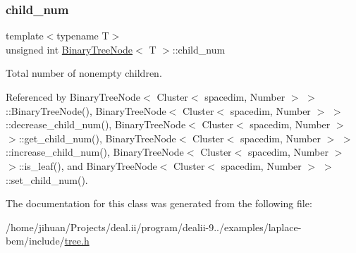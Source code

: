 \subsubsection{\texorpdfstring{child\+\_\+num}{child\_num}}
{\footnotesize\ttfamily template$<$typename T$>$ \\
unsigned int \hyperlink{classBinaryTreeNode}{Binary\+Tree\+Node}$<$ T $>$\+::child\+\_\+num\hspace{0.3cm}{\ttfamily [private]}}

Total number of nonempty children. 

Referenced by Binary\+Tree\+Node$<$ Cluster$<$ spacedim, Number $>$ $>$\+::\+Binary\+Tree\+Node(), Binary\+Tree\+Node$<$ Cluster$<$ spacedim, Number $>$ $>$\+::decrease\+\_\+child\+\_\+num(), Binary\+Tree\+Node$<$ Cluster$<$ spacedim, Number $>$ $>$\+::get\+\_\+child\+\_\+num(), Binary\+Tree\+Node$<$ Cluster$<$ spacedim, Number $>$ $>$\+::increase\+\_\+child\+\_\+num(), Binary\+Tree\+Node$<$ Cluster$<$ spacedim, Number $>$ $>$\+::is\+\_\+leaf(), and Binary\+Tree\+Node$<$ Cluster$<$ spacedim, Number $>$ $>$\+::set\+\_\+child\+\_\+num().



The documentation for this class was generated from the following file\+:\begin{DoxyCompactItemize}
\item 
/home/jihuan/\+Projects/deal.\+ii/program/dealii-\/9../examples/laplace-\/bem/include/\hyperlink{tree_8h}{tree.\+h}\end{DoxyCompactItemize}
